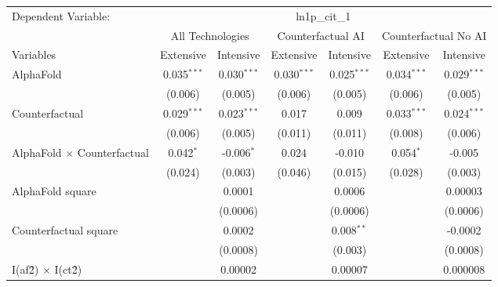 \begingroup
\centering
\begin{tabular}{lcccccc}
   \tabularnewline \midrule \midrule
   Dependent Variable: & \multicolumn{6}{c}{ln1p\_cit\_1}\\
 & \multicolumn{2}{c}{All Technologies} & \multicolumn{2}{c}{Counterfactual AI} & \multicolumn{2}{c}{Counterfactual No AI} \\
\cmidrule(lr){1-1}\cmidrule(lr){2-3} \cmidrule(lr){4-5} \cmidrule(lr){6-7}
Variables & \multicolumn{1}{c}{Extensive} & \multicolumn{1}{c}{Intensive} & \multicolumn{1}{c}{Extensive} & \multicolumn{1}{c}{Intensive} & \multicolumn{1}{c}{Extensive} & \multicolumn{1}{c}{Intensive} \\
\cmidrule(lr){1-1}\cmidrule(lr){2-2} \cmidrule(lr){3-3} \cmidrule(lr){4-4} \cmidrule(lr){5-5} \cmidrule(lr){6-6} \cmidrule(lr){7-7}
   AlphaFold                          & 0.035$^{***}$ & 0.030$^{***}$ & 0.030$^{***}$ & 0.025$^{***}$ & 0.034$^{***}$ & 0.029$^{***}$\\   
                                      & (0.006)       & (0.005)       & (0.006)       & (0.005)       & (0.006)       & (0.005)\\   
   Counterfactual                     & 0.029$^{***}$ & 0.023$^{***}$ & 0.017         & 0.009         & 0.033$^{***}$ & 0.024$^{***}$\\   
                                      & (0.006)       & (0.005)       & (0.011)       & (0.011)       & (0.008)       & (0.006)\\   
   AlphaFold $\times$ Counterfactual  & 0.042$^{*}$   & -0.006$^{*}$  & 0.024         & -0.010        & 0.054$^{*}$   & -0.005\\   
                                      & (0.024)       & (0.003)       & (0.046)       & (0.015)       & (0.028)       & (0.003)\\   
   AlphaFold square                   &               & 0.0001        &               & 0.0006        &               & 0.00003\\   
                                      &               & (0.0006)      &               & (0.0006)      &               & (0.0006)\\   
   Counterfactual square              &               & 0.0002        &               & 0.008$^{**}$  &               & -0.0002\\   
                                      &               & (0.0008)      &               & (0.003)       &               & (0.0008)\\   
   I(af\^2) $\times$ I(ct\^2)         &               & 0.00002       &               & 0.00007       &               & 0.000008\\   

\end{tabular}
